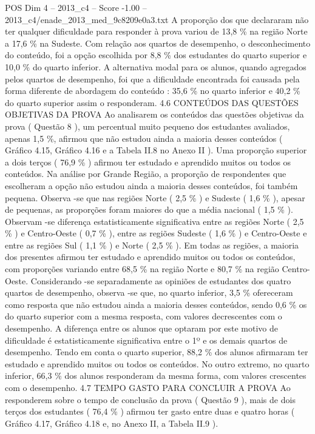 \begin{textsample}{POS Dim 4 – 2013\_c4 – Score -1.00 – 2013\_c4/enade\_2013\_med\_9c8209e0a3.txt}
A proporção dos que declararam não ter qualquer dificuldade para responder à prova variou de 13,8 \% na região Norte a 17,6 \% na Sudeste.
Com relação aos quartos de desempenho, o desconhecimento do conteúdo, foi a opção escolhida por 8,8 \% dos estudantes do quarto superior e 10,0 \% do quarto inferior.
A alternativa modal para os alunos, quando agregados pelos quartos de desempenho, foi que a dificuldade encontrada foi causada pela forma diferente de abordagem do conteúdo : 35,6 \% no quarto inferior e 40,2 \% do quarto superior assim o responderam. 4.6 CONTEÚDOS DAS QUESTÕES OBJETIVAS DA PROVA Ao analisarem os conteúdos das questões objetivas da prova ( Questão 8 ), um percentual muito pequeno dos estudantes avaliados, apenas 1,5 \%, afirmou que não estudou ainda a maioria desses conteúdos ( Gráfico 4.15, Gráfico 4.16 e a Tabela II.8 no Anexo II ).
Uma proporção superior a dois terços ( 76,9 \% ) afirmou ter estudado e aprendido muitos ou todos os conteúdos.
Na análise por Grande Região, a proporção de respondentes que escolheram a opção não estudou ainda a maioria desses conteúdos, foi também pequena.
Observa -se que nas regiões Norte ( 2,5 \% ) e Sudeste ( 1,6 \% ), apesar de pequenas, as proporções foram maiores do que a média nacional ( 1,5 \% ).
Observam -se diferença estatisticamente significativa entre as regiões Norte ( 2,5 \% ) e Centro-Oeste ( 0,7 \% ), entre as regiões Sudeste ( 1,6 \% ) e Centro-Oeste e entre as regiões Sul ( 1,1 \% ) e Norte ( 2,5 \% ).
Em todas as regiões, a maioria dos presentes afirmou ter estudado e aprendido muitos ou todos os conteúdos, com proporções variando entre 68,5 \% na região Norte e 80,7 \% na região Centro-Oeste.
Considerando -se separadamente as opiniões de estudantes dos quatro quartos de desempenho, observa -se que, no quarto inferior, 3,5 \% ofereceram como resposta que não estudou ainda a maioria desses conteúdos, sendo 0,6 \% os do quarto superior com a mesma resposta, com valores decrescentes com o desempenho.
A diferença entre os alunos que optaram por este motivo de dificuldade é estatisticamente significativa entre o 1º e os demais quartos de desempenho.
Tendo em conta o quarto superior, 88,2 \% dos alunos afirmaram ter estudado e aprendido muitos ou todos os conteúdos.
No outro extremo, no quarto inferior, 66,3 \% dos alunos responderam da mesma forma, com valores crescentes com o desempenho. 4.7 TEMPO GASTO PARA CONCLUIR A PROVA Ao responderem sobre o tempo de conclusão da prova ( Questão 9 ), mais de dois terços dos estudantes ( 76,4 \% ) afirmou ter gasto entre duas e quatro horas ( Gráfico 4.17, Gráfico 4.18 e, no Anexo II, a Tabela II.9 ).

\end{textsample}
